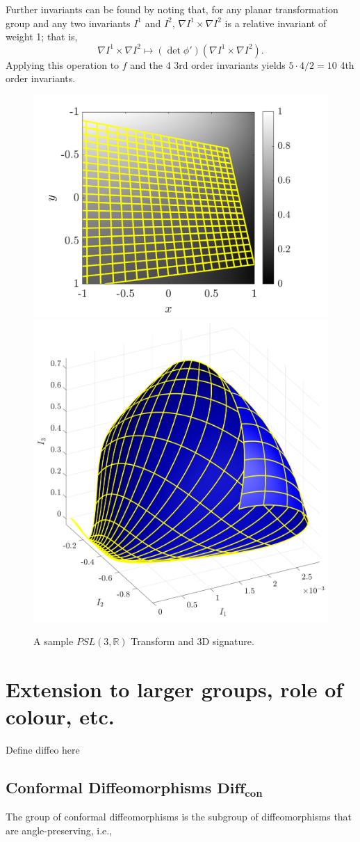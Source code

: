 \documentclass[review,onefignum,onetabnum]{siamonline190516}
\begin{document}
Further invariants can be found by noting that, for any planar transformation group and any two invariants
$I^1$ and $I^2$, $\nabla I^1 \times \nabla I^2$ is a relative invariant of weight 1; that is,
$$\nabla I^1 \times \nabla I^2\mapsto (\det \phi')(\nabla I^1 \times \nabla I^2).$$
Applying this operation to $f$ and the 4 3rd order invariants yields $5\cdot4/2=1$0  4th order invariants.

\begin{figure}
\centering
\includegraphics[width=.45\textwidth]{Figs/f_transformed_PSL3R.png}
\includegraphics[width=.45\textwidth]{Figs/PSL3R_signature.png}
\caption{A sample $PSL(3,\mathbb{R})$ Transform and 3D signature.}
\label{fig:PSL3R}
\end{figure}

\section{Extension to larger groups, role of colour, etc.}
\label{sec:aaah}

Define diffeo here

\subsection{Conformal Diffeomorphisms $\mathbf{Diff}_{\mathbf{con}}$}


The group of conformal diffeomorphisms is the subgroup of diffeomorphisms that are angle-preserving, i.e.,
\end{document}

